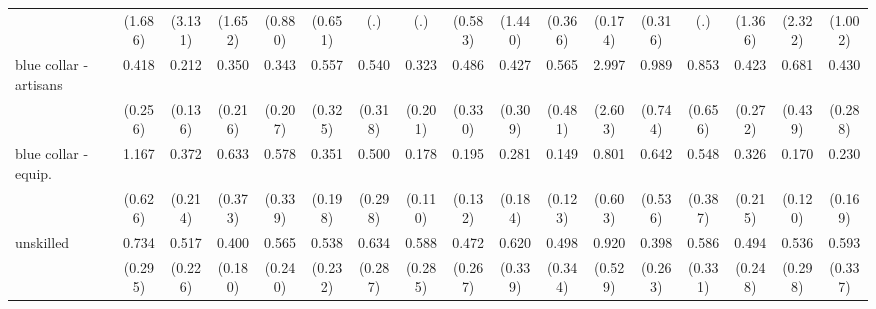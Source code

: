 {\begin{tabular}{l*{16}{c}}
                    &     (1.686)         &     (3.131)         &     (1.652)         &     (0.880)         &     (0.651)         &         (.)         &         (.)         &     (0.583)         &     (1.440)         &     (0.366)         &     (0.174)         &     (0.316)         &         (.)         &     (1.366)         &     (2.322)         &     (1.002)         \\
[1em]
blue collar - artisans&       0.418         &       0.212\sym{*}  &       0.350         &       0.343         &       0.557         &       0.540         &       0.323         &       0.486         &       0.427         &       0.565         &       2.997         &       0.989         &       0.853         &       0.423         &       0.681         &       0.430         \\
                    &     (0.256)         &     (0.136)         &     (0.216)         &     (0.207)         &     (0.325)         &     (0.318)         &     (0.201)         &     (0.330)         &     (0.309)         &     (0.481)         &     (2.603)         &     (0.744)         &     (0.656)         &     (0.272)         &     (0.439)         &     (0.288)         \\
[1em]
blue collar - equip.&       1.167         &       0.372         &       0.633         &       0.578         &       0.351         &       0.500         &       0.178\sym{**} &       0.195\sym{*}  &       0.281         &       0.149\sym{*}  &       0.801         &       0.642         &       0.548         &       0.326         &       0.170\sym{*}  &       0.230\sym{*}  \\
                    &     (0.626)         &     (0.214)         &     (0.373)         &     (0.339)         &     (0.198)         &     (0.298)         &     (0.110)         &     (0.132)         &     (0.184)         &     (0.123)         &     (0.603)         &     (0.536)         &     (0.387)         &     (0.215)         &     (0.120)         &     (0.169)         \\
[1em]
unskilled           &       0.734         &       0.517         &       0.400\sym{*}  &       0.565         &       0.538         &       0.634         &       0.588         &       0.472         &       0.620         &       0.498         &       0.920         &       0.398         &       0.586         &       0.494         &       0.536         &       0.593         \\
                    &     (0.295)         &     (0.226)         &     (0.180)         &     (0.240)         &     (0.232)         &     (0.287)         &     (0.285)         &     (0.267)         &     (0.339)         &     (0.344)         &     (0.529)         &     (0.263)         &     (0.331)         &     (0.248)         &     (0.298)         &     (0.337)         \\

\end{tabular}}
